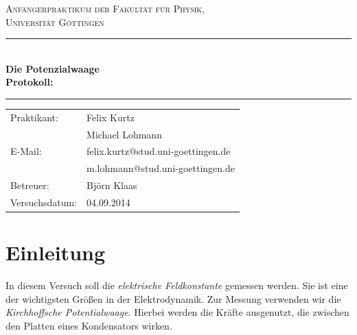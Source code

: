 \documentclass[12pt,a4paper,titlepage,headinclude,bibtotoc]{scrartcl}
\begin{document}
\begin{titlepage}
\centering
\textsc{\Large Anfängerpraktikum der Fakultät für
  Physik,\\[1.5ex] Universität Göttingen}

\vspace*{4.2cm}

\rule{\textwidth}{1pt}\\[0.5cm]
{\huge \bfseries
  Die Potenzialwaage\\[1.5ex]
  Protokoll:}\\[0.5cm]
\rule{\textwidth}{1pt}

\vspace*{3.0cm}

\begin{Large}
\begin{tabular}{ll}
Praktikant:
 	&  Felix Kurtz\\
 	&  Michael Lohmann\\

  E-Mail: 
	&  felix.kurtz@stud.uni-goettingen.de\\
	& m.lohmann@stud.uni-goettingen.de\\

 Betreuer: & Björn Klaas\\
 Versuchsdatum: & 04.09.2014\\
\end{tabular}
\end{Large}

\vspace*{0.8cm}

\begin{Large}
\end{Large}

\end{titlepage}

\tableofcontents

\newpage

\section{Einleitung}
\label{sec:einleitung}
In diesem Versuch soll die \textit{elektrische Feldkonstante} gemessen werden.
Sie ist eine der wichtigsten Größen in der Elektrodynamik.
Zur Messung verwenden wir die \textit{Kirchhoffsche Potentialwaage}.
Hierbei werden die Kräfte ausgenutzt, die zwischen den Platten eines Kondensators wirken.
\end{document}
